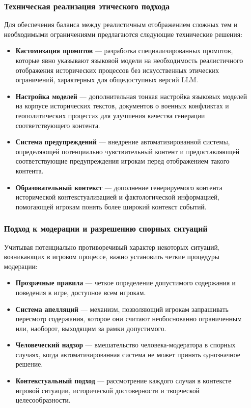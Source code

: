 \subsubsection{Техническая реализация этического подхода}

Для обеспечения баланса между реалистичным отображением сложных тем и необходимыми ограничениями предлагаются следующие технические решения:

\begin{itemize}
    \item \textbf{Кастомизация промптов} — разработка специализированных промптов, которые явно указывают языковой модели на необходимость реалистичного отображения исторических процессов без искусственных этических ограничений, характерных для общедоступных версий LLM.

    \item \textbf{Настройка моделей} — дополнительная тонкая настройка языковых моделей на корпусе исторических текстов, документов о военных конфликтах и геополитических процессах для улучшения качества генерации соответствующего контента.

    \item \textbf{Система предупреждений} — внедрение автоматизированной системы, определяющей потенциально чувствительный контент и предоставляющей соответствующие предупреждения игрокам перед отображением такого контента.

    \item \textbf{Образовательный контекст} — дополнение генерируемого контента исторической контекстуализацией и фактологической информацией, помогающей игрокам понять более широкий контекст событий.
\end{itemize}

\subsubsection{Подход к модерации и разрешению спорных ситуаций}

Учитывая потенциально противоречивый характер некоторых ситуаций, возникающих в игровом процессе, важно установить четкие процедуры модерации:

\begin{itemize}
    \item \textbf{Прозрачные правила} — четкое определение допустимого содержания и поведения в игре, доступное всем игрокам.

    \item \textbf{Система апелляций} — механизм, позволяющий игрокам запрашивать пересмотр содержания, которое они считают необоснованно ограниченным или, наоборот, выходящим за рамки допустимого.

    \item \textbf{Человеческий надзор} — вмешательство человека-модератора в спорных случаях, когда автоматизированная система не может принять однозначное решение.

    \item \textbf{Контекстуальный подход} — рассмотрение каждого случая в контексте игровой ситуации, исторической достоверности и творческой целесообразности.
\end{itemize}

